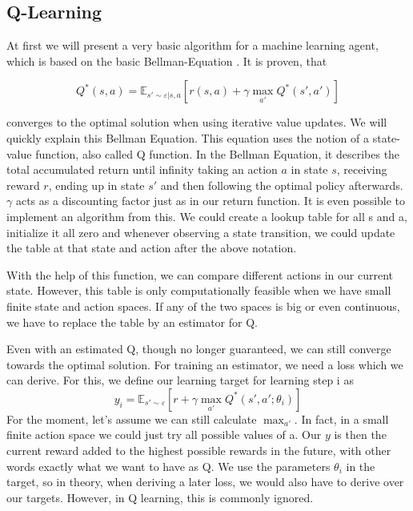 \documentclass[hyperref,german,beleg]{cgvpub}
\begin{document}
\subsection{Q-Learning}

At first we will present a very basic algorithm for a machine learning agent, which is based on the basic Bellman-Equation \cite{bellmanTheoryDynamicProgramming1954}. It is proven, that

\begin{equation}
Q^*(s, a) = \mathbb{E}_{s' \sim \varepsilon | s,a}[r(s,a) + \gamma\max_{a'}Q^*(s', a')]
\end{equation}

converges to the optimal solution when using iterative value updates. We will quickly explain this Bellman Equation. This equation uses the notion of a state-value function, also called Q function. In the Bellman Equation, it describes the total accumulated return until infinity taking an action $a$ in state $s$, receiving reward $r$, ending up in state $s'$ and then following the optimal policy afterwards. $\gamma$ acts as a discounting factor just as in our return function. It is even possible to implement an algorithm from this. We could create a lookup table for all s and a, initialize it all zero and whenever observing a state transition, we could update the table at that state and action after the above notation.

With the help of this function, we can compare different actions in our current state. However, this table is only computationally feasible when we have small finite state and action spaces. If any of the two spaces is big or even continuous, we have to replace the table by an estimator for Q.

Even with an estimated Q, though no longer guaranteed, we can still converge towards the optimal solution. For training an estimator, we need a loss which we can derive. For this, we define our learning target for learning step i as
\begin{equation}
y_i = \mathbb{E}_{s' \sim \varepsilon}[r + \gamma \max_{a'}Q^*(s', a';\theta_{i})]
\end{equation}
For the moment, let's assume we can still calculate $\max_{a'}$. In fact, in a small finite action space we could just try all possible values of a. Our $y$ is then the current reward added to the highest possible rewards in the future, with other words exactly what we want to have as Q. We use the parameters $\theta_{i}$ in the target, so in theory, when deriving a later loss, we would also have to derive over our targets. However, in Q learning, this is commonly ignored.
\end{document}

